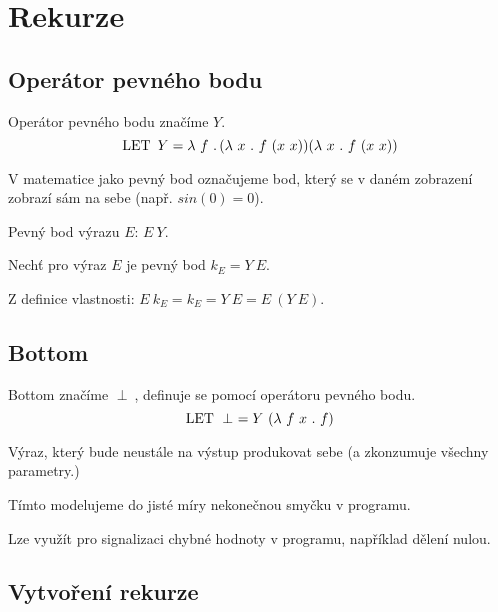 
\section{Rekurze}

\subsection{Operátor pevného bodu}

\begin{compactitem}
    \item Operátor pevného bodu značíme $Y$.
    $$ \operatorname{\text{LET~}} Y = \operatorname{\lambda\,} f \operatorname{\,.\,} ( \operatorname{\lambda\,} x \operatorname{\,.\,} f ~ (x ~ x)) (\operatorname{\lambda\,} x \operatorname{\,.\,} f ~ (x ~ x)) $$

    \item V matematice jako pevný bod označujeme bod, který se v daném zobrazení zobrazí sám na sebe (např. $sin(0) = 0$).

    \item Pevný bod výrazu $E$: $E ~ Y$.

    \item Nechť pro výraz $E$ je pevný bod $k_E = Y ~ E$.

    \item Z definice vlastnosti: $E ~ k_E = k_E = Y ~ E = E ~ (Y ~ E)$.
\end{compactitem}

\subsection{Bottom}

\begin{compactitem}
    \item Bottom značíme $\perp~$, definuje se pomocí operátoru pevného bodu.
    $$ \operatorname{\text{LET~}} \perp~ = Y ~ ( \operatorname{\lambda\,} f ~ x \operatorname{\,.\,} f ) $$
    \item Výraz, který bude neustále na výstup produkovat sebe (a zkonzumuje všechny parametry.)
    \item Tímto modelujeme do jisté míry nekonečnou smyčku v programu. \begin{compactitem}
        \item Lze využít pro signalizaci chybné hodnoty v programu, například dělení nulou.
    \end{compactitem}
\end{compactitem}

\subsection{Vytvoření rekurze}

